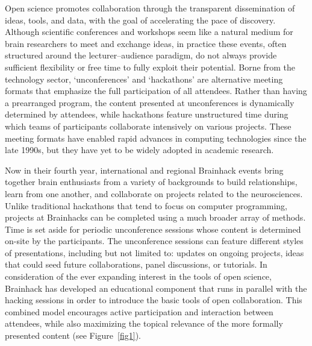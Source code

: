 \documentclass[11pt]{bmc_article_s50}
\begin{document}
Open science promotes collaboration through the transparent dissemination of ideas, tools, and data, with the goal of accelerating the pace of discovery. Although scientific conferences and workshops seem like a natural medium for brain researchers to meet and exchange ideas, in practice these events, often structured around the lecturer--audience paradigm, do not always provide sufficient flexibility or free time to fully exploit their potential. Borne from the technology sector, `unconferences' and `hackathons' are alternative meeting formats that emphasize the full participation of all attendees. Rather than having a prearranged program, the content presented at unconferences is dynamically determined by attendees, while hackathons feature unstructured time during which teams of participants collaborate intensively on various projects. These meeting formats have enabled rapid advances in computing technologies since the late 1990s, but they have yet to be widely adopted in academic research. 


Now in their fourth year, international and regional Brainhack events bring together brain enthusiasts from a variety of backgrounds to build relationships, learn from one another, and collaborate on projects related to the neurosciences. Unlike traditional hackathons that tend to focus on computer programming, projects at Brainhacks can be completed using a much broader array of methods. Time is set aside for periodic unconference sessions whose content is determined on-site by the participants. The unconference sessions can feature different styles of presentations, including but not limited to: updates on ongoing projects, ideas that could seed future collaborations, panel discussions, or tutorials. In consideration of the ever expanding interest in the tools of open science, Brainhack has developed an educational component that runs in parallel with the hacking sessions in order to introduce the basic tools of open collaboration. This combined model encourages active participation and interaction between attendees, while also maximizing the topical relevance of the more formally presented content (see Figure~\ref{fig1}).
\end{document}
